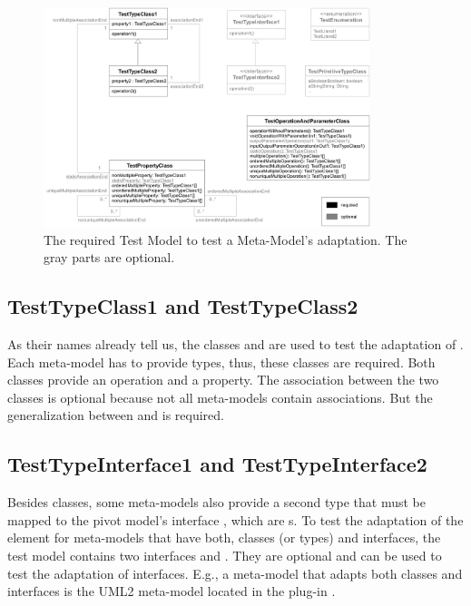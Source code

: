 \begin{figure}
	\includegraphics[width=0.85\textwidth]{figures/metamodeltestsuite/testModel.pdf}
	\caption{The required Test Model to test a Meta-Model's adaptation. The gray parts are optional.}
	\label{pic:metaModelTestsuite:testModel}
\end{figure}


\subsection{TestTypeClass1 and TestTypeClass2}

As their names already tell us, the classes  and 
 are used to test the adaptation of . Each 
meta-model has to provide types, thus, these classes are required. Both classes 
provide an operation and a property. The association between the two classes is 
optional because not all meta-models contain associations. But the
generalization between  and  is 
required.


\subsection{TestTypeInterface1 and TestTypeInterface2}

Besides classes, some meta-models also provide a second type that must be mapped
to the pivot model's interface , which are s. To test
the adaptation of the  element for meta-models that have both,
classes (or types) and interfaces, the test model contains two interfaces 
 and . They are optional and
can be used to test the adaptation of interfaces. E.g., a meta-model that adapts
both classes and interfaces is the \acs{UML}2 meta-model located in the plug-in 
.



